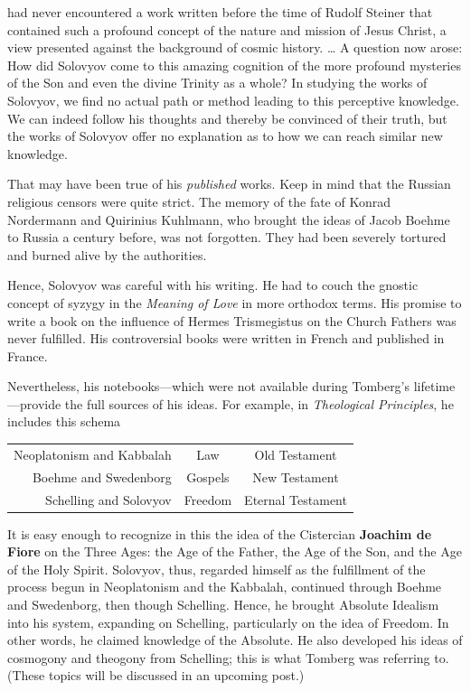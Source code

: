 \begin{quotex}
[I] had never encountered a work written before the time of Rudolf Steiner that contained such a profound concept of the nature and mission of Jesus Christ, a view presented against the background of cosmic history. … A question now arose: How did Solovyov come to this amazing cognition of the more profound mysteries of the Son and even the divine Trinity as a whole? In studying the works of Solovyov, we find no actual path or method leading to this perceptive knowledge. We can indeed follow his thoughts and thereby be convinced of their truth, but the works of Solovyov offer no explanation as to how we can reach similar new knowledge. 

\end{quotex}
That may have been true of his \emph{published} works. Keep in mind that the Russian religious censors were quite strict. The memory of the fate of Konrad Nordermann and Quirinius Kuhlmann, who brought the ideas of Jacob Boehme to Russia a century before, was not forgotten. They had been severely tortured and burned alive by the authorities.

Hence, Solovyov was careful with his writing. He had to couch the gnostic concept of syzygy in the \emph{Meaning of Love} in more orthodox terms. His promise to write a book on the influence of Hermes Trismegistus on the Church Fathers was never fulfilled. His controversial books were written in French and published in France.

Nevertheless, his notebooks—which were not available during Tomberg's lifetime—provide the full sources of his ideas. For example, in \emph{Theological Principles}, he includes this schema

\begin{table}[h]\centering\small
\begin{tabular}{rcc}\toprule
Neoplatonism and Kabbalah &
Law &
Old Testament\\
Boehme and Swedenborg &
Gospels &
New Testament\\
Schelling and Solovyov &
Freedom &
Eternal Testament\\\bottomrule
\end{tabular}
\end{table}
It is easy enough to recognize in this the idea of the Cistercian \textbf{Joachim de Fiore} on the Three Ages: the Age of the Father, the Age of the Son, and the Age of the Holy Spirit. Solovyov, thus, regarded himself as the fulfillment of the process begun in Neoplatonism and the Kabbalah, continued through Boehme and Swedenborg, then though Schelling. Hence, he brought Absolute Idealism into his system, expanding on Schelling, particularly on the idea of Freedom. In other words, he claimed knowledge of the Absolute. He also developed his ideas of cosmogony and theogony from Schelling; this is what Tomberg was referring to. (These topics will be discussed in an upcoming post.)

